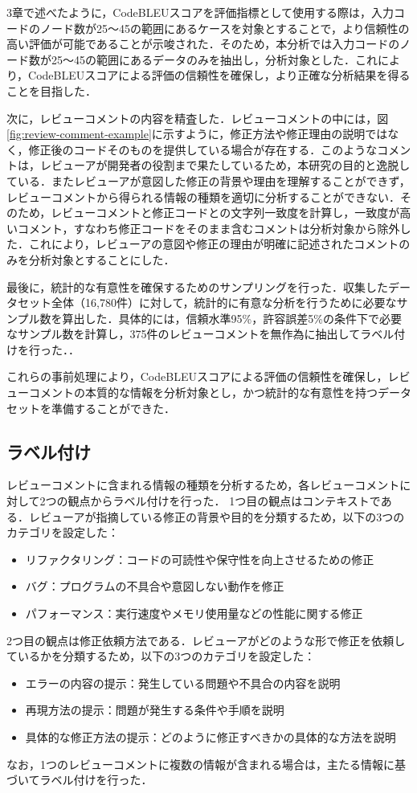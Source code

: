 \documentclass[11pt]{jreport}
\begin{document}
3章で述べたように，CodeBLEUスコアを評価指標として使用する際は，入力コードのノード数が25〜45の範囲にあるケースを対象とすることで，より信頼性の高い評価が可能であることが示唆された．そのため，本分析では入力コードのノード数が25〜45の範囲にあるデータのみを抽出し，分析対象とした．これにより，CodeBLEUスコアによる評価の信頼性を確保し，より正確な分析結果を得ることを目指した．

次に，レビューコメントの内容を精査した．レビューコメントの中には，図\ref{fig:review-comment-example}に示すように，修正方法や修正理由の説明ではなく，修正後のコードそのものを提供している場合が存在する．このようなコメントは，レビューアが開発者の役割まで果たしているため，本研究の目的と逸脱している．またレビューアが意図した修正の背景や理由を理解することができず，レビューコメントから得られる情報の種類を適切に分析することができない．そのため，レビューコメントと修正コードとの文字列一致度を計算し，一致度が高いコメント，すなわち修正コードをそのまま含むコメントは分析対象から除外した．これにより，レビューアの意図や修正の理由が明確に記述されたコメントのみを分析対象とすることにした．

最後に，統計的な有意性を確保するためのサンプリングを行った．収集したデータセット全体（16,780件）に対して，統計的に有意な分析を行うために必要なサンプル数を算出した．具体的には，信頼水準95\%，許容誤差5\%の条件下で必要なサンプル数を計算し，375件のレビューコメントを無作為に抽出してラベル付けを行った．．

これらの事前処理により，CodeBLEUスコアによる評価の信頼性を確保し，レビューコメントの本質的な情報を分析対象とし，かつ統計的な有意性を持つデータセットを準備することができた．


\subsection{ラベル付け}
レビューコメントに含まれる情報の種類を分析するため，各レビューコメントに対して2つの観点からラベル付けを行った．
1つ目の観点はコンテキストである．レビューアが指摘している修正の背景や目的を分類するため，以下の3つのカテゴリを設定した：
\begin{itemize}
\item リファクタリング：コードの可読性や保守性を向上させるための修正
\item バグ：プログラムの不具合や意図しない動作を修正
\item パフォーマンス：実行速度やメモリ使用量などの性能に関する修正
\end{itemize}
2つ目の観点は修正依頼方法である．レビューアがどのような形で修正を依頼しているかを分類するため，以下の3つのカテゴリを設定した：
\begin{itemize}
\item エラーの内容の提示：発生している問題や不具合の内容を説明
\item 再現方法の提示：問題が発生する条件や手順を説明
\item 具体的な修正方法の提示：どのように修正すべきかの具体的な方法を説明
\end{itemize}
なお，1つのレビューコメントに複数の情報が含まれる場合は，主たる情報に基づいてラベル付けを行った．
\end{document}
